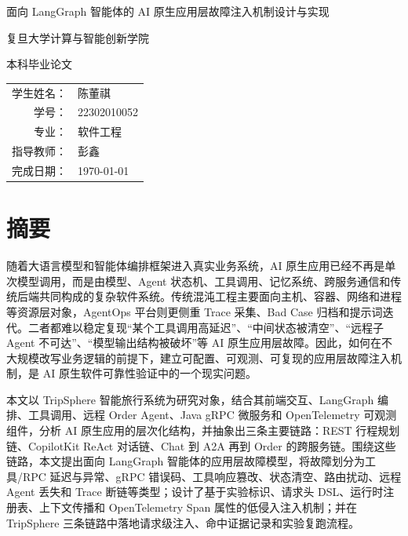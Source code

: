 \begin{titlepage}
  \centering
  \vspace*{2cm}
  {\heiti{} 面向 LangGraph 智能体的 AI 原生应用层故障注入机制设计与实现\par}
  \vspace{2cm}
  { 复旦大学计算与智能创新学院\par}
  \vspace{0.8cm}
  { 本科毕业论文\par}
  \vfill
  \begin{tabular}{rl}
    学生姓名： & 陈董祺 \\
    学号： & 22302010052  \\
    专业： & 软件工程 \\
    指导教师： & 彭鑫 \\
    完成日期： & \today
  \end{tabular}
  \vspace*{2cm}
\end{titlepage}

\chapter*{摘\quad 要}

随着大语言模型和智能体编排框架进入真实业务系统，AI 原生应用已经不再是单次模型调用，而是由模型、Agent 状态机、工具调用、记忆系统、跨服务通信和传统后端共同构成的复杂软件系统。传统混沌工程主要面向主机、容器、网络和进程等资源层对象，AgentOps 平台则更侧重 Trace 采集、Bad Case 归档和提示词迭代。二者都难以稳定复现“某个工具调用高延迟”、“中间状态被清空”、“远程子 Agent 不可达”、“模型输出结构被破坏”等 AI 原生应用层故障。因此，如何在不大规模改写业务逻辑的前提下，建立可配置、可观测、可复现的应用层故障注入机制，是 AI 原生软件可靠性验证中的一个现实问题。

本文以 TripSphere 智能旅行系统为研究对象，结合其前端交互、LangGraph 编排、工具调用、远程 Order Agent、Java gRPC 微服务和 OpenTelemetry 可观测组件，分析 AI 原生应用的层次化结构，并抽象出三条主要链路：REST 行程规划链、CopilotKit ReAct 对话链、Chat 到 A2A 再到 Order 的跨服务链。围绕这些链路，本文提出面向 LangGraph 智能体的应用层故障模型，将故障划分为工具/RPC 延迟与异常、gRPC 错误码、工具响应篡改、状态清空、路由扰动、远程 Agent 丢失和 Trace 断链等类型；设计了基于实验标识、请求头 DSL、运行时注册表、上下文传播和 OpenTelemetry Span 属性的低侵入注入机制；并在 TripSphere 三条链路中落地请求级注入、命中证据记录和实验复跑流程。

